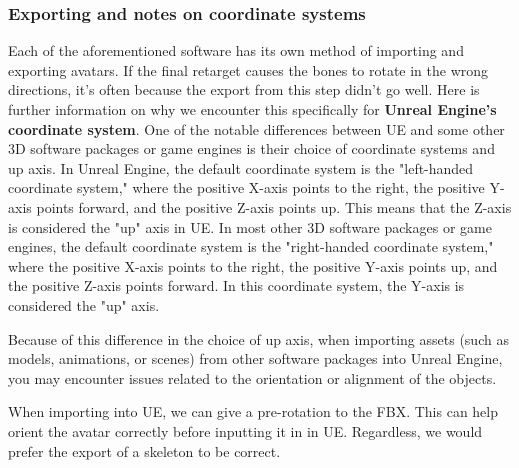 \documentclass{uva-inf-article}
\begin{document}
\subsubsection{Exporting and notes on coordinate systems}
Each of the aforementioned software has its own method of importing and exporting avatars. If the final retarget causes the bones to rotate in the wrong directions, it's often because the export from this step didn't go well. Here is further information on why we encounter this specifically for  \textbf{Unreal Engine's coordinate system}.
One of the notable differences between UE and some other 3D software packages or game engines is their choice of coordinate systems and up axis.
In Unreal Engine, the default coordinate system is the "left-handed coordinate system," where the positive X-axis points to the right, the positive Y-axis points forward, and the positive Z-axis points up. This means that the Z-axis is considered the "up" axis in UE.
In most other 3D software packages or game engines, the default coordinate system is the "right-handed coordinate system," where the positive X-axis points to the right, the positive Y-axis points up, and the positive Z-axis points forward. In this coordinate system, the Y-axis is considered the "up" axis.

Because of this difference in the choice of up axis, when importing assets (such as models, animations, or scenes) from other software packages into Unreal Engine, you may encounter issues related to the orientation or alignment of the objects.

When importing into UE, we can give a pre-rotation to the FBX. This can help orient the avatar correctly before inputting it in in UE.
Regardless, we would prefer the export of a skeleton to be correct.
\end{document}
